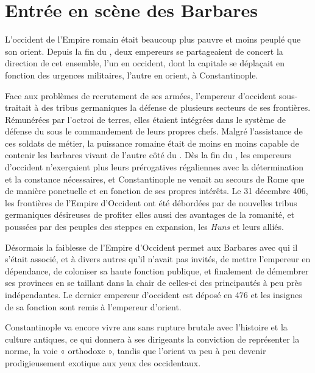 
\section{Entrée en scène des Barbares}


 L'occident de l'Empire romain était beaucoup plus pauvre et moins peuplé que son orient. Depuis la fin du , deux empereurs se partageaient de concert la direction de cet ensemble, l'un en occident, dont la capitale se déplaçait en fonction des urgences militaires, l'autre en orient, à Constantinople. 

 Face aux problèmes de recrutement de ses armées, l'empereur d'occident sous-traitait à des tribus germaniques la défense de plusieurs secteurs de ses frontières. Rémunérées par l'octroi de terres, elles étaient intégrées dans le système de défense du  sous le commandement de leurs propres chefs. Malgré l'assistance de ces soldats de métier, la puissance romaine était de moins en moins capable de contenir les barbares vivant de l'autre côté du . Dès la fin du , les empereurs d'occident n'exerçaient plus leurs prérogatives régaliennes avec la détermination et la constance nécessaires, et Constantinople ne venait au secours de Rome que de manière ponctuelle et en fonction de ses propres intérêts. Le 31 décembre 406, les frontières de l'Empire d'Occident ont été débordées par de nouvelles tribus germaniques désireuses de profiter elles aussi des avantages de la romanité, et poussées par des peuples des steppes en expansion, les \emph{Huns} et leurs alliés.

 Désormais la faiblesse de l'Empire d'Occident permet aux Barbares avec qui il s'était associé, et à divers autres qu'il n'avait pas invités, de mettre l'empereur en dépendance, de coloniser sa haute fonction publique, et finalement de démembrer ses provinces en se taillant dans la chair de celles-ci des principautés à peu près indépendantes. Le dernier empereur d'occident est déposé en 476 et les insignes de sa fonction sont remis à l'empereur d'orient. 

 Constantinople va encore vivre  ans sans rupture brutale avec l'histoire et la culture antiques, ce qui donnera à ses dirigeants la conviction de représenter la norme, la voie « orthodoxe », tandis que l'orient va peu à peu devenir prodigieusement exotique aux yeux des occidentaux.

